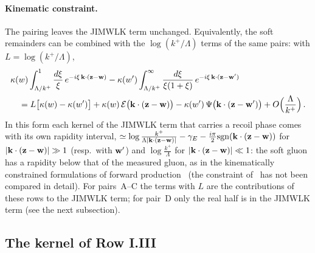 \paragraph{Kinematic constraint.} The pairing leaves the JIMWLK term unchanged. Equivalently, the soft remainders can be combined with the $\log(k^+/\Lambda)$ terms of the same pairs: with $L=\log(k^+/\Lambda)$,
\begin{align}\label{eq:kinconstr}
&\kappa(w)\int_{\Lambda/k^+}^{1}\frac{d\xi}{\xi}\,e^{-i\xi\,\mathbf{k}\cdot(\mathbf{z}-\mathbf{w})}-\kappa(w')\int_{\Lambda/k^+}^\infty\frac{d\xi}{\xi(1+\xi)}\,e^{-i\xi\,\mathbf{k}\cdot(\mathbf{z}-\mathbf{w}')}\notag\\
&\quad=L\big[\kappa(w)-\kappa(w')\big]+\kappa(w)\,\mathcal E\big(\mathbf{k}\cdot(\mathbf{z}-\mathbf{w})\big)-\kappa(w')\,\Psi\big(\mathbf{k}\cdot(\mathbf{z}-\mathbf{w}')\big)+O\Big(\frac{\Lambda}{k^+}\Big)\,.
\end{align}
In this form each kernel of the JIMWLK term that carries a recoil phase comes with its own rapidity interval, $\simeq\log\frac{k^+}{\Lambda|\mathbf{k}\cdot(\mathbf{z}-\mathbf{w})|}-\gamma_E-\frac{i\pi}{2}{\rm sgn}(\mathbf{k}\cdot(\mathbf{z}-\mathbf{w}))$ for $|\mathbf{k}\cdot(\mathbf{z}-\mathbf{w})|\gg1$ (resp.\ with $\mathbf{w}'$) and $\log\frac{k^+}{\Lambda}$ for $|\mathbf{k}\cdot(\mathbf{z}-\mathbf{w})|\ll1$: the soft gluon has a rapidity below that of the measured gluon, as in the kinematically constrained formulations of forward production~\cite{Altinoluk:2014eka,Ducloue:2016shw} (the constraint of~\cite{Ducloue:2016shw} has not been compared in detail). For pairs~A--C the terms with $L$ are the contributions of these rows to the JIMWLK term; for pair~D only the real half is in the JIMWLK term (see the next subsection).

\subsection{The kernel of Row I.III}\label{sec:fin_GIIII}

